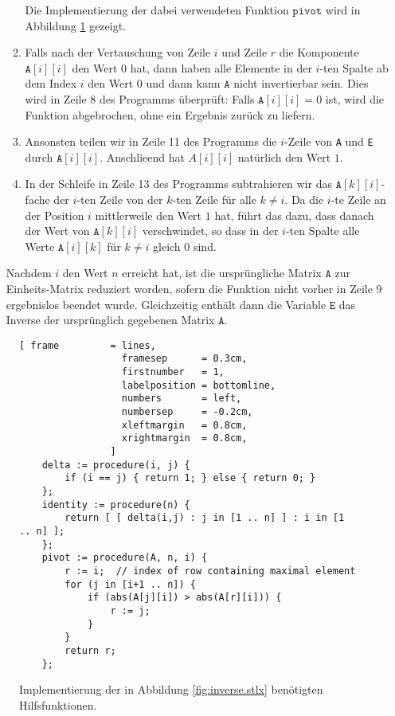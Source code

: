 \begin{enumerate}
\begin{enumerate}
              Die Implementierung der dabei verwendeten Funktion $\mathtt{pivot}$ wird in Abbildung
              \ref{fig:inverse.stlx-pivot} gezeigt.
      \item Falls nach der Vertauschung von Zeile $i$ und Zeile $r$ die Komponente
            $\mathtt{A}[i][i]$ den Wert $0$ hat, dann haben alle
            Elemente in der $i$-ten Spalte ab dem Index $i$ den Wert $0$ und dann kann $\mathtt{A}$ nicht
            invertierbar sein.  Dies wird in Zeile 8 des Programms \"{u}berpr\"{u}ft: Falls 
            $\mathtt{A}[i][i] = 0$ ist, wird die Funktion abgebrochen, ohne ein Ergebnis zur\"{u}ck zu
            liefern. 
      \item Ansonsten teilen wir in Zeile 11 des Programms die $i$-Zeile von \texttt{A} und
            \texttt{E} durch $\mathtt{A}[i][i]$.  Anschlie\3end hat $A[i][i]$ nat\"{u}rlich den Wert $1$.
      \item In der Schleife in Zeile 13 des Programms subtrahieren wir das $\mathtt{A}[k][i]$-fache
            der $i$-ten Zeile von der $k$-ten Zeile f\"ur alle $k \not= i$.  Da die $i$-te Zeile an der Position $i$
            mittlerweile den Wert $1$ hat, f\"{u}hrt das dazu, dass danach der Wert von
            $\mathtt{A}[k][i]$ verschwindet, so dass in der $i$-ten Spalte alle Werte
            $\mathtt{A}[i][k]$ f\"{u}r $k \not= i$ gleich $0$ sind.
      \end{enumerate}
      Nachdem $i$ den Wert $n$ erreicht hat, ist die urspr\"{u}ngliche Matrix $\mathtt{A}$ zur
      Einheits-Matrix reduziert worden, sofern die Funktion nicht vorher in Zeile 9 ergebnislos  
      beendet wurde.  Gleichzeitig enth\"{a}lt dann die Variable $\mathtt{E}$ das Inverse der
      urspr\"{u}nglich gegebenen Matrix $\mathtt{A}$.
\end{enumerate}

\begin{figure}[!ht]
\centering
\begin{Verbatim}[ frame         = lines, 
                  framesep      = 0.3cm, 
                  firstnumber   = 1,
                  labelposition = bottomline,
                  numbers       = left,
                  numbersep     = -0.2cm,
                  xleftmargin   = 0.8cm,
                  xrightmargin  = 0.8cm,
                ]
    delta := procedure(i, j) {
        if (i == j) { return 1; } else { return 0; }
    };
    identity := procedure(n) {
        return [ [ delta(i,j) : j in [1 .. n] ] : i in [1 .. n] ];
    };
    pivot := procedure(A, n, i) {
        r := i;  // index of row containing maximal element
        for (j in [i+1 .. n]) {
            if (abs(A[j][i]) > abs(A[r][i])) {
                r := j;
            }
        }
        return r;
    };
\end{Verbatim}
\vspace*{-0.3cm}
\caption{Implementierung der in Abbildung \ref{fig:inverse.stlx} ben\"{o}tigten Hilfsfunktionen.}
\label{fig:inverse.stlx-pivot}
\end{figure}


